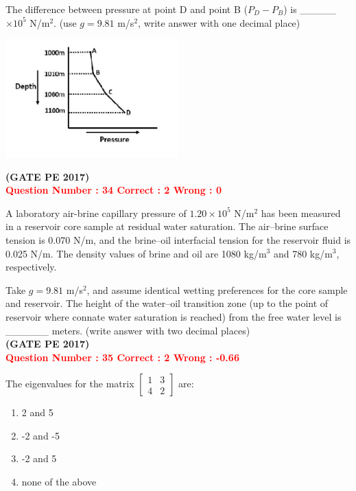 \documentclass[journal,12pt,onecolumn]{article}
\begin{document}
{The difference between pressure at point D and point B ($P_D - P_B$) is \_\_\_\_\_ $\times 10^5$ N/m$^2$. (use $g = 9.81$ m/s$^2$, write answer with one decimal place)

\begin{center}
    \includegraphics[width=0.5\textwidth]{Figs/GraphQ _33.png} 
\end{center}
\hfill\textbf{(GATE PE 2017)}\\[0.6cm]

\textcolor{red}{\textbf{Question Number : 34 \hfill Correct : 2  Wrong : 0}}

A laboratory air-brine capillary pressure of $1.20 \times 10^5$ N/m$^2$ has been measured in a reservoir core sample at residual water saturation. The air–brine surface tension is 0.070 N/m, and the brine–oil interfacial tension for the reservoir fluid is 0.025 N/m. The density values of brine and oil are 1080 kg/m$^3$ and 780 kg/m$^3$, respectively.

Take $g = 9.81$ m/s$^2$, and assume identical wetting preferences for the core sample and reservoir. The height of the water–oil transition zone (up to the point of reservoir where connate water saturation is reached) from the free water level is \_\_\_\_\_\_ meters. (write answer with two decimal places)\\

\hfill\textbf{(GATE PE 2017)}\\[0.6cm]

\textcolor{red}{\textbf{Question Number : 35 \hfill Correct : 2  Wrong : -0.66}}

The eigenvalues for the matrix 
$ 
\begin{bmatrix}
1 & 3 \\
4 & 2
\end{bmatrix}
$ 
are:

\begin{enumerate}[label=(\Alph*)]
    \item 2 and 5
    \item -2 and -5
    \item -2 and 5
    \item none of the above
\end{enumerate}

}
\end{document}
